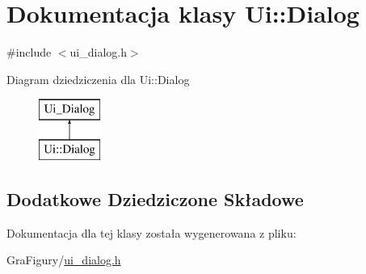 \hypertarget{classUi_1_1Dialog}{\section{Dokumentacja klasy Ui\-:\-:Dialog}
\label{classUi_1_1Dialog}
}


{\ttfamily \#include $<$ui\-\_\-dialog.\-h$>$}

Diagram dziedziczenia dla Ui\-:\-:Dialog\begin{figure}[H]
\begin{center}
\leavevmode
\includegraphics[height=2.000000cm]{df/d9e/classUi_1_1Dialog}
\end{center}
\end{figure}
\subsection*{Dodatkowe Dziedziczone Składowe}


Dokumentacja dla tej klasy została wygenerowana z pliku\-:\begin{DoxyCompactItemize}
\item 
Gra\-Figury/\hyperlink{ui__dialog_8h}{ui\-\_\-dialog.\-h}\end{DoxyCompactItemize}
